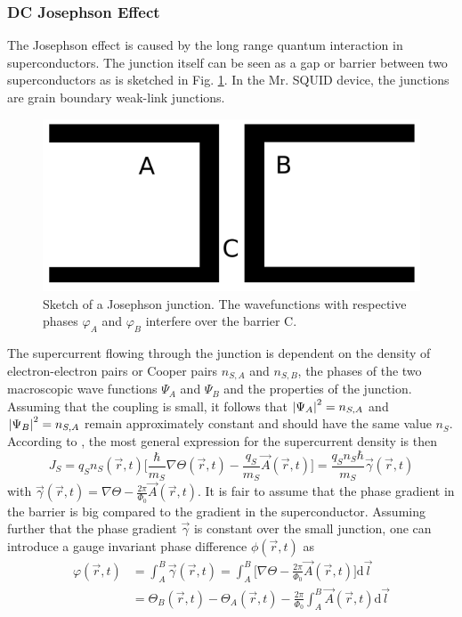 \documentclass[a4paper,10pt]{article}
\newcommand{\dif}{\mathrm{d}}
\begin{document}
\subsubsection*{DC Josephson Effect}
The Josephson effect is caused by the long range quantum interaction in superconductors. The junction itself can be seen as a gap or barrier between two superconductors as is sketched in Fig. \ref{figure_josephson_junction}. In the Mr. SQUID \cite{skriptum} device, the junctions are grain boundary weak-link junctions. 

\begin{figure}[htp!]
    \centering
    \includegraphics[width = 0.6 \textwidth]{josephson.png}
    \caption{Sketch of a Josephson junction. The wavefunctions with respective phases $\varphi_A$ and $\varphi_B$ interfere over the barrier C.}
    \label{figure_josephson_junction}
\end{figure}

The supercurrent flowing through the junction is dependent on the density of electron-electron pairs or Cooper pairs $n_{S,A}$ and $n_{S,B}$, the phases of the two macroscopic wave functions $\Psi_A$ and $\Psi_B$ and the properties of the junction. Assuming that the coupling is small, it follows that $\abs{\Psi_A}^2 = n_{S,A}$ and $\abs{\Psi_B}^2 = n_{S,A}$ remain approximately constant and should have the same value $n_{S}$. 
According to \cite{grossmarx}, the most general expression for the supercurrent density is then 
\begin{equation}
    J_S = q_S n_S(\vec{r},t) \big[ \frac{\hbar}{m_S} \nabla \Theta(\vec{r},t) - \frac{q_S}{m_S} \vec{A}(\vec{r},t) \big] = \frac{q_S n_S \hbar}{m_S} \vec{\gamma}(\vec{r},t)
\end{equation}
with $\vec{\gamma}(\vec{r},t) = \nabla \Theta - \frac{2 \pi}{\Phi_0} \vec{A}(\vec{r},t)$. It is fair to assume that the phase gradient in the barrier is big compared to the gradient in the superconductor. Assuming further that the phase gradient $\vec{\gamma}$ is constant over the small junction, one can introduce a gauge invariant phase difference $\phi(\vec{r}, t)$ as 
\begin{equation}
    \begin{split}
        \label{eq_phase}
        \varphi(\vec{r}, t) &= \int^B_A \vec{\gamma}(\vec{r},t) = \int^B_A \big[ \nabla \Theta - \frac{2 \pi}{\Phi_0} \vec{A}(\vec{r},t) \big] \dif \vec{l} \\
        &= \Theta_B(\vec{r}, t) - \Theta_A(\vec{r}, t) - \frac{2 \pi}{\Phi_0} \int^B_A \vec{A}(\vec{r},t) \dif \vec{l}
    \end{split}
\end{equation}
\end{document}

